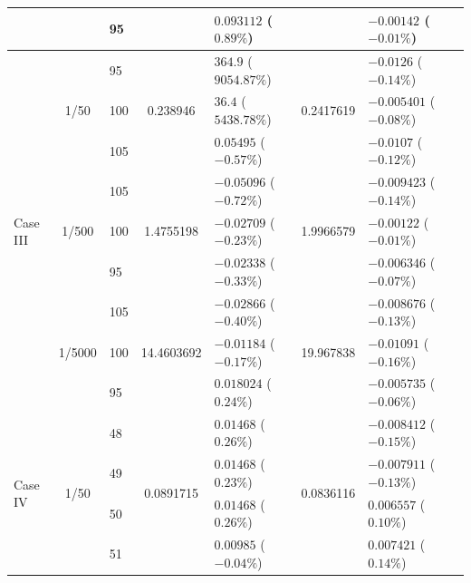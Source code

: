 \begin{table}[htbp]
{\begin{tabular}{lclclclc}
    &                         & 95  &                           & $0.093112$ ($0.89\%$)    &                           & $-0.00142$ ($-0.01\%$)    \\
    \midrule
    \multirow{9}{*}{Case III}
    & \multirow{3}{*}{1/50}  & 95  & \multirow{3}{*}{0.238946}  & $364.9$ ($9054.87\%$)   & \multirow{3}{*}{0.2417619} & $-0.0126$ ($-0.14\%$)     \\
    &                         & 100 &                           & $36.4$ ($5438.78\%$)     &                           & $-0.005401$ ($-0.08\%$)   \\
    &                         & 105 &                           & $0.05495$ ($-0.57\%$)    &                           & $-0.0107$ ($-0.12\%$)     \\
    \cmidrule(lr){2-7}
    & \multirow{3}{*}{1/500} & 105 & \multirow{3}{*}{1.4755198} & $-0.05096$ ($-0.72\%$)  & \multirow{3}{*}{1.9966579} & $-0.009423$ ($-0.14\%$)   \\
    &                         & 100 &                           & $-0.02709$ ($-0.23\%$)   &                           & $-0.00122$ ($-0.01\%$)    \\
    &                         & 95  &                           & $-0.02338$ ($-0.33\%$)   &                           & $-0.006346$ ($-0.07\%$)   \\
    \cmidrule(lr){2-7}
    & \multirow{3}{*}{1/5000}& 105 & \multirow{3}{*}{14.4603692}& $-0.02866$ ($-0.40\%$)  & \multirow{3}{*}{19.967838} & $-0.008676$ ($-0.13\%$)   \\
    &                         & 100 &                           & $-0.01184$ ($-0.17\%$)   &                           & $-0.01091$ ($-0.16\%$)    \\
    &                         & 95  &                           & $0.018024$ ($0.24\%$)    &                           & $-0.005735$ ($-0.06\%$)   \\
    \midrule
    \multirow{15}{*}{Case IV}
    & \multirow{5}{*}{1/50}  & 48 & \multirow{5}{*}{0.0891715} & $0.01468$ ($0.26\%$)     & \multirow{5}{*}{0.0836116} & $-0.008412$ ($-0.15\%$)   \\
    &                        & 49 &                          & $0.01468$ ($0.23\%$)     &                          & $-0.007911$ ($-0.13\%$)   \\
    &                        & 50 &                          & $0.01468$ ($0.26\%$)     &                          & $0.006557$ ($0.10\%$)     \\
    &                        & 51 &                          & $0.00985$ ($-0.04\%$)    &                          & $0.007421$ ($0.14\%$)     \\

\end{tabular}}
\end{table}
